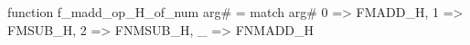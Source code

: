 function f_madd_op_H_of_num arg# = match arg# {
  0 => FMADD_H,
  1 => FMSUB_H,
  2 => FNMSUB_H,
  _ => FNMADD_H
}

